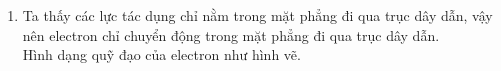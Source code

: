       \begin{loigiai}
      \renewcommand{\theequation}{\arabic{equation}}
    \begin{enumerate}[1)]
    \setlength{\itemsep}{0pt}
        \item Ta thấy các lực tác dụng chỉ nằm trong mặt phẳng đi qua trục dây dẫn, vậy nên electron chỉ chuyển động trong mặt phẳng đi qua trục dây dẫn.\\
        Hình dạng quỹ đạo của electron như hình vẽ.
        \begin{center}
            


\begin{tikzpicture}[x=0.75pt,y=0.75pt,yscale=-1,xscale=1]


\end{tikzpicture}
\end{center}
\end{enumerate}
\end{loigiai}
